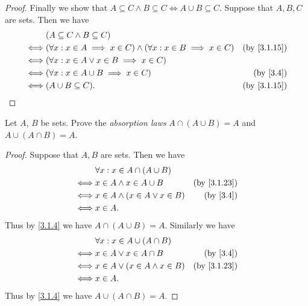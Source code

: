 \begin{proof}
  Finally we show that \(A \subseteq C \land B \subseteq C \iff A \cup B \subseteq C\).
  Suppose that \(A, B, C\) are sets.
  Then we have
  \begin{align*}
         & (A \subseteq C \land B \subseteq C)                                                                             \\
    \iff & (\forall x : x \in A \implies x \in C) \land (\forall x : x \in B \implies x \in C) & \text{(by \cref{3.1.15})} \\
    \iff & (\forall x : x \in A \lor x \in B \implies x \in C)                                                             \\
    \iff & (\forall x : x \in A \cup B \implies x \in C)                                       & \text{(by \cref{3.4})}    \\
    \iff & (A \cup B \subseteq C).                                                             & \text{(by \cref{3.1.15})}
  \end{align*}
\end{proof}

\begin{ex}\label{ex:3.1.8}
  Let \(A\), \(B\) be sets.
  Prove the \emph{absorption laws} \(A \cap (A \cup B) = A\) and \(A \cup (A \cap B) = A\).
\end{ex}

\begin{proof}
  Suppose that \(A, B\) are sets.
  Then we have
  \begin{align*}
         & \forall x : x \in A \cap (A \cup B)                              \\
    \iff & x \in A \land x \in A \cup B         & \text{(by \cref{3.1.23})} \\
    \iff & x \in A \land (x \in A \lor x \in B) & \text{(by \cref{3.4})}    \\
    \iff & x \in A.
  \end{align*}
  Thus by \cref{3.1.4} we have \(A \cap (A \cup B) = A\).
  Similarly we have
  \begin{align*}
         & \forall x : x \in A \cup (A \cap B)                              \\
    \iff & x \in A \lor x \in A \cap B          & \text{(by \cref{3.4})}    \\
    \iff & x \in A \lor (x \in A \land x \in B) & \text{(by \cref{3.1.23})} \\
    \iff & x \in A.
  \end{align*}
  Thus by \cref{3.1.4} we have \(A \cup (A \cap B) = A\).
\end{proof}

